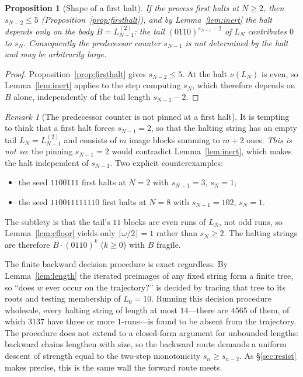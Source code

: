 \documentclass[11pt,reqno]{amsart}
\theoremstyle{plain}
\newtheorem{proposition}{Proposition}
\theoremstyle{definition}
\theoremstyle{remark}
\newtheorem{remark}{Remark}
\begin{document}
\begin{proposition}[Shape of a first halt]\label{prop:halt-corr}
If the process first halts at $N\ge 2$, then $s_{N-2}\le 5$ (Proposition~\ref{prop:firsthalt}), and by Lemma~\ref{lem:inert} the halt depends only on the body $B=L^{(2)}_{N-1}$: the tail $(0110)^{s_{N-1}-2}$ of $L_N$ contributes $0$ to $s_N$. Consequently the predecessor counter $s_{N-1}$ is not determined by the halt and may be arbitrarily large.
\end{proposition}
\begin{proof}
Proposition~\ref{prop:firsthalt} gives $s_{N-2}\le 5$. At the halt $\nu(L_N)$ is even, so Lemma~\ref{lem:inert} applies to the step computing $s_N$, which therefore depends on $B$ alone, independently of the tail length $s_{N-1}-2$.
\end{proof}

\begin{remark}[The predecessor counter is not pinned at a first halt]\label{rem:rem-pinning}
It is tempting to think that a first halt forces $s_{N-1}=2$, so that the halting string has an empty tail $L_N=L^{(2)}_{N-1}$ and consists of $m$ image blocks summing to $m+2$ ones. \emph{This is not so}: the pinning $s_{N-1}=2$ would contradict Lemma~\ref{lem:inert}, which makes the halt independent of $s_{N-1}$. Two explicit counterexamples:
\begin{itemize}
\item the seed $1100111$ first halts at $N=2$ with $s_{N-1}=3$, $s_N=1$;
\item the seed $110011111110$ first halts at $N=8$ with $s_{N-1}=102$, $s_N=1$.
\end{itemize}
The subtlety is that the tail's $11$ blocks are even runs of $L_N$, not odd runs, so Lemma~\ref{lem:cfloor} yields only $\lceil\omega/2\rceil=1$ rather than $s_N\ge 2$. The halting strings are therefore $B\cdot(0110)^k$ ($k\ge 0$) with $B$ fragile.
\end{remark}

The finite backward decision procedure is exact regardless. By Lemma~\ref{lem:length} the iterated preimages of any fixed string form a finite tree, so ``does $w$ ever occur on the trajectory?'' is decided by tracing that tree to its roots and testing membership of $L_0=10$. Running this decision procedure wholesale, every halting string of length at most $14$---there are $4565$ of them, of which $3137$ have three or more $1$-runs---is found to be absent from the trajectory. The procedure does not extend to a closed-form argument for unbounded lengths: backward chains lengthen with size, so the backward route demands a uniform descent of strength equal to the two-step monotonicity $s_n\ge s_{n-2}$. As \S\ref{sec:resist} makes precise, this is the same wall the forward route meets.
\end{document}
